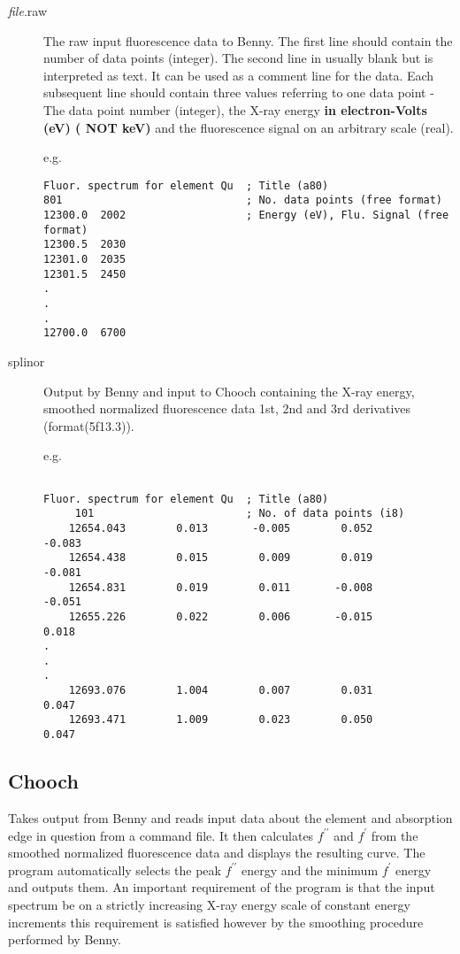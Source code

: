 \documentclass[a4]{article}
\begin{document}
\begin{description}
\item[{{\it file}.raw}] The raw input fluorescence data to {\sc
Benny}. The first line should contain the number of data points
(integer). The second line in usually blank but is interpreted as
text. It can be used as a comment line for the data.  Each subsequent
line should contain three values referring to one data point - The
data point number (integer), the X-ray energy {\bf in electron-Volts (eV) ( NOT keV)} 
and the fluorescence signal on an arbitrary scale (real).

e.g.
\begin{verbatim}
Fluor. spectrum for element Qu  ; Title (a80)
801                             ; No. data points (free format)
12300.0  2002                   ; Energy (eV), Flu. Signal (free format)
12300.5  2030
12301.0  2035
12301.5  2450
.
.
.
12700.0  6700
\end{verbatim}

\item[splinor] Output by {\sc Benny} and input to {\sc Chooch}
containing the X-ray energy, smoothed normalized fluorescence data
1st, 2nd and 3rd derivatives (format(5f13.3)).

e.g.

\begin{verbatim} 

Fluor. spectrum for element Qu  ; Title (a80)
     101                        ; No. of data points (i8)
    12654.043        0.013       -0.005        0.052       -0.083
    12654.438        0.015        0.009        0.019       -0.081
    12654.831        0.019        0.011       -0.008       -0.051
    12655.226        0.022        0.006       -0.015        0.018
.
.
.
    12693.076        1.004        0.007        0.031        0.047
    12693.471        1.009        0.023        0.050        0.047
\end{verbatim}
\end{description}

\subsection{\sc Chooch}

Takes output from Benny and reads input data about the element and
absorption edge in question from a command file.  It then calculates
$f^{\prime\prime}$ and $f^{\prime}$ from the smoothed normalized
fluorescence data and displays the resulting curve. The program
automatically selects the peak $f^{\prime\prime}$ energy and the
minimum $f^{\prime}$ energy and outputs them.  An important
requirement of the program is that the input spectrum be on a strictly
increasing X-ray energy scale of constant energy increments this
requirement is satisfied however by the smoothing procedure performed
by {\sc Benny}.
\end{document}
